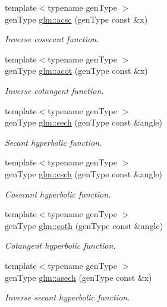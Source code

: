 \begin{DoxyCompactItemize}
{\footnotesize template$<$typename gen\-Type $>$ }\\gen\-Type \hyperlink{group__gtc__reciprocal_ga8c4a4156fcd45b6fca189ac77c963ffd}{glm\-::acsc} (gen\-Type const \&x)
\begin{DoxyCompactList}\small\item\em Inverse cosecant function. \end{DoxyCompactList}\item 
{\footnotesize template$<$typename gen\-Type $>$ }\\gen\-Type \hyperlink{group__gtc__reciprocal_ga134eae20165da173c3765b141eb2100a}{glm\-::acot} (gen\-Type const \&x)
\begin{DoxyCompactList}\small\item\em Inverse cotangent function. \end{DoxyCompactList}\item 
{\footnotesize template$<$typename gen\-Type $>$ }\\gen\-Type \hyperlink{group__gtc__reciprocal_ga9c16b922edc8b0a2fdffa2a70b1ebe3f}{glm\-::sech} (gen\-Type const \&angle)
\begin{DoxyCompactList}\small\item\em Secant hyperbolic function. \end{DoxyCompactList}\item 
{\footnotesize template$<$typename gen\-Type $>$ }\\gen\-Type \hyperlink{group__gtc__reciprocal_gac03c75d9cb8d1fa2ef963fd73ef51448}{glm\-::csch} (gen\-Type const \&angle)
\begin{DoxyCompactList}\small\item\em Cosecant hyperbolic function. \end{DoxyCompactList}\item 
{\footnotesize template$<$typename gen\-Type $>$ }\\gen\-Type \hyperlink{group__gtc__reciprocal_ga603ef43fd67fad0ab95e9b0977877804}{glm\-::coth} (gen\-Type const \&angle)
\begin{DoxyCompactList}\small\item\em Cotangent hyperbolic function. \end{DoxyCompactList}\item 
{\footnotesize template$<$typename gen\-Type $>$ }\\gen\-Type \hyperlink{group__gtc__reciprocal_ga4b692b0db1cb789a0160eda1c1a603d6}{glm\-::asech} (gen\-Type const \&x)
\begin{DoxyCompactList}\small\item\em Inverse secant hyperbolic function. \end{DoxyCompactList}\item 

\end{DoxyCompactItemize}
